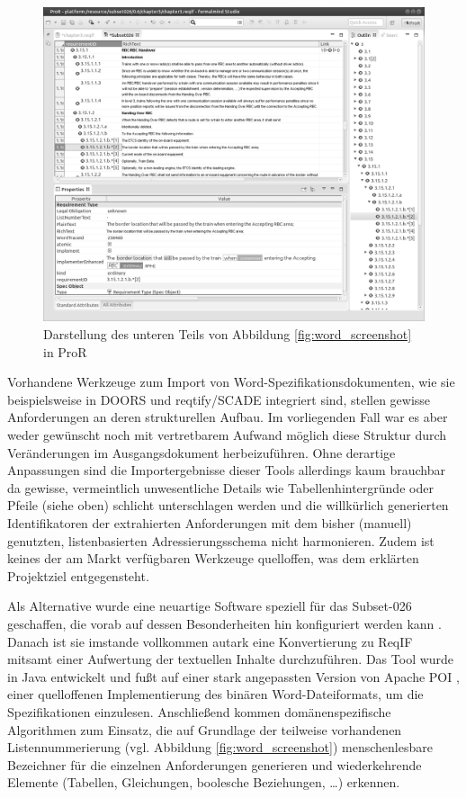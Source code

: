 \documentclass[twoside]{article}
\begin{document}
\begin{multicols}{2}
\begin{figure}
\centering
\includegraphics[width=\linewidth]{img/pror_screenshot.png}
\caption{Darstellung des unteren Teils von Abbildung \ref{fig:word_screenshot} in ProR}
\label{fig:pror_screenshot}
\end{figure}

Vorhandene Werkzeuge zum Import von Word-Spezifikationsdokumenten, wie sie beispielsweise in DOORS und reqtify/SCADE integriert sind, stellen gewisse Anforderungen an deren strukturellen Aufbau. Im vorliegenden Fall war es aber weder gewünscht noch mit vertretbarem Aufwand möglich diese Struktur durch Veränderungen im Ausgangsdokument herbeizuführen. Ohne derartige Anpassungen sind die Importergebnisse dieser Tools allerdings kaum brauchbar da gewisse, vermeintlich unwesentliche Details wie Tabellenhintergründe oder Pfeile (siehe oben) schlicht unterschlagen werden und die willkürlich generierten Identifikatoren der extrahierten Anforderungen mit dem bisher (manuell) genutzten, listenbasierten Adressierungsschema nicht harmonieren. Zudem ist keines der am Markt verfügbaren Werkzeuge quelloffen, was dem erklärten Projektziel entgegensteht.

Als Alternative wurde eine neuartige Software speziell für das \glqq{}Subset-026\grqq{} geschaffen, die vorab auf dessen Besonderheiten hin konfiguriert werden kann \cite{TodoMoriz}. Danach ist sie imstande vollkommen autark eine Konvertierung zu ReqIF mitsamt einer Aufwertung der textuellen Inhalte durchzuführen. Das Tool wurde in Java entwickelt und fußt auf einer stark angepassten Version von Apache POI \cite{poi}, einer quelloffenen Implementierung des binären Word-Dateiformats, um die Spezifikationen einzulesen. Anschließend kommen domänenspezifische Algorithmen zum Einsatz, die auf Grundlage der teilweise vorhandenen Listennummerierung (vgl. Abbildung \ref{fig:word_screenshot}) menschenlesbare Bezeichner für die einzelnen Anforderungen generieren und wiederkehrende Elemente (Tabellen, Gleichungen, boolesche Beziehungen, \ldots{}) erkennen.


\end{multicols}
\end{document}
